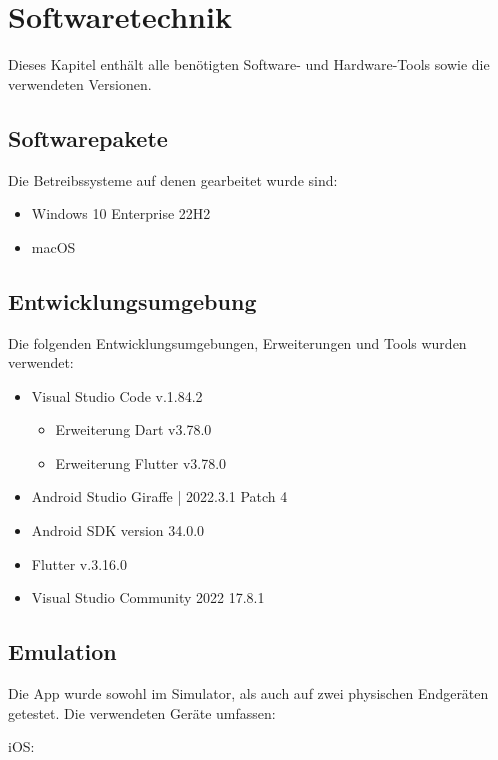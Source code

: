 
\chapter{Softwaretechnik}

Dieses Kapitel enthält alle benötigten Software- und Hardware-Tools sowie die verwendeten Versionen.

\section{Softwarepakete}

Die Betreibssysteme auf denen gearbeitet wurde sind:

\begin{itemize}
  \item Windows 10 Enterprise 22H2
  \item macOS
\end{itemize}

\section{Entwicklungsumgebung}

Die folgenden Entwicklungsumgebungen, Erweiterungen und Tools wurden verwendet:

\begin{itemize}
  \item Visual Studio Code v.1.84.2
  \begin{itemize}
    \item Erweiterung Dart v3.78.0
    \item Erweiterung Flutter v3.78.0
  \end{itemize}
  \item Android Studio Giraffe | 2022.3.1 Patch 4
  \item Android SDK version 34.0.0
  \item Flutter v.3.16.0
  \item Visual Studio Community 2022 17.8.1
\end{itemize}


\section{Emulation}

Die App wurde sowohl im Simulator, als auch auf zwei physischen Endgeräten getestet.
Die verwendeten Geräte umfassen:

iOS:

